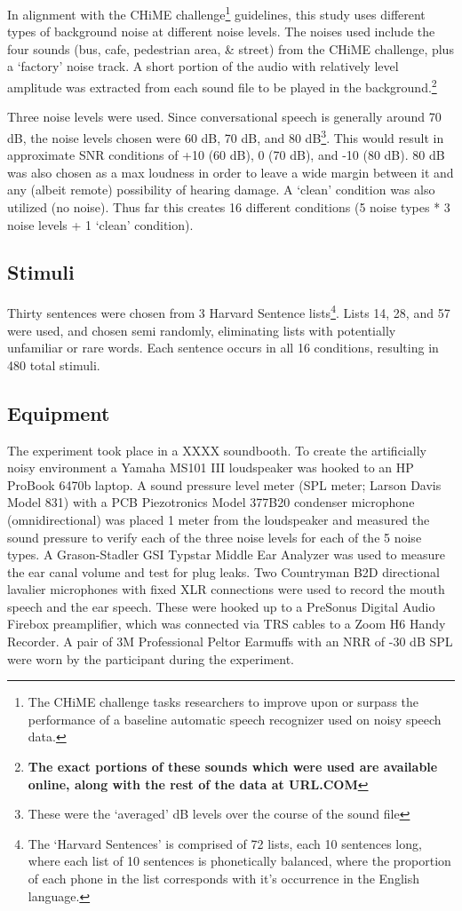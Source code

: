 \documentclass[dissertation,copyright]{uathesis}
\begin{document}
In alignment with the CHiME challenge\footnote{The CHiME challenge tasks researchers to improve upon or surpass the performance of a baseline automatic speech recognizer used on noisy speech data.} guidelines, this study uses different types of background noise at different noise levels.  The noises used include the four sounds (bus, cafe, pedestrian area, \& street) from the CHiME\cite{chime:16} challenge, plus a `factory' noise track.  A short portion of the audio with relatively level amplitude was extracted from each sound file to be played in the background.\footnote{\textbf{The exact portions of these sounds which were used are available online, along with the rest of the data at URL.COM}}

Three noise levels were used.  Since conversational speech is generally around 70 dB, the noise levels chosen were 60 dB, 70 dB, and 80 dB\footnote{These were the `averaged' dB levels over the course of the sound file}.  This would result in approximate SNR conditions of +10 (60 dB), 0 (70 dB), and -10 (80 dB).  80 dB was also chosen as a max loudness in order to leave a wide margin between it and any (albeit remote) possibility of hearing damage. A `clean' condition was also utilized (no noise).  Thus far this creates 16 different conditions (5 noise types * 3 noise levels + 1 `clean' condition).  

\subsection{Stimuli}
Thirty sentences were chosen from 3 Harvard Sentence lists\footnote{The `Harvard Sentences' is comprised of 72 lists, each 10 sentences long, where each list of 10 sentences is phonetically balanced, where the proportion of each phone in the list corresponds with it's occurrence in the English language.\cite{harvardsentenceURL}}.  Lists 14, 28, and 57 were used, and chosen semi randomly, eliminating lists with potentially unfamiliar or rare words.  Each sentence occurs in all 16 conditions, resulting in 480 total stimuli.

  
\subsection{Equipment}

The experiment took place in a XXXX soundbooth.  To create the artificially noisy environment a Yamaha MS101 III loudspeaker was hooked to an HP ProBook 6470b laptop.  A sound pressure level meter (SPL meter; Larson Davis Model 831) with a PCB Piezotronics Model 377B20 condenser microphone (omnidirectional) was placed 1 meter from the loudspeaker and measured the sound pressure to verify each of the three noise levels for each of the 5 noise types. A Grason-Stadler GSI Typstar Middle Ear Analyzer was used to measure the ear canal volume and test for plug leaks.  Two Countryman B2D directional lavalier microphones with fixed XLR connections were used to record the mouth speech and the ear speech.  These were hooked up to a PreSonus Digital Audio Firebox preamplifier, which was connected via TRS cables to a Zoom H6 Handy Recorder. A pair of 3M Professional Peltor Earmuffs with an NRR of -30 dB SPL were worn by the participant during the experiment.
\end{document}
